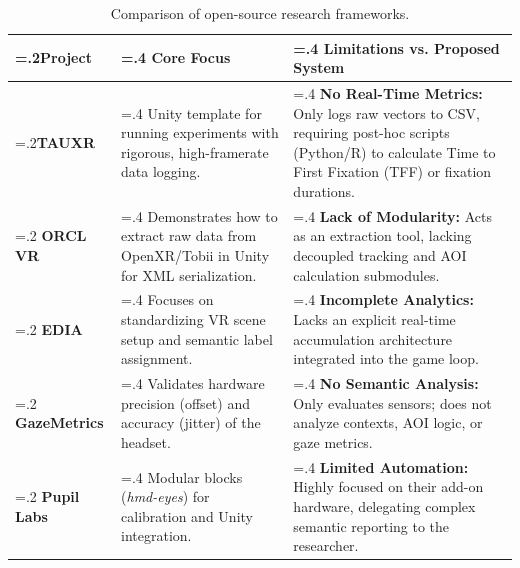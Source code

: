 \documentclass[12pt,a4paper]{article}
\begin{document}
\begin{table}[H]
    \centering
    \small
    \begin{tabularx}{\textwidth}{@{} >{\hsize=.2\hsize}X >{\hsize=.4\hsize}X >{\hsize=.4\hsize}X @{}}
        \toprule
        \textbf{Project}                        & \textbf{Core Focus}                                                                    & \textbf{Limitations vs. Proposed System}                                                                                                                            \\
        \midrule
        \textbf{TAUXR} \cite{tauxr}             & Unity template for running experiments with rigorous, high-framerate data logging.     & \textbf{No Real-Time Metrics:} Only logs raw vectors to CSV, requiring post-hoc scripts (Python/R) to calculate Time to First Fixation (TFF) or fixation durations. \\
        \addlinespace
        \textbf{ORCL VR} \cite{orcl}            & Demonstrates how to extract raw data from OpenXR/Tobii in Unity for XML serialization. & \textbf{Lack of Modularity:} Acts as an extraction tool, lacking decoupled tracking and AOI calculation submodules.                                                 \\
        \addlinespace
        \textbf{EDIA} \cite{edia}               & Focuses on standardizing VR scene setup and semantic label assignment.                 & \textbf{Incomplete Analytics:} Lacks an explicit real-time accumulation architecture integrated into the game loop.                                                 \\
        \addlinespace
        \textbf{GazeMetrics} \cite{gazemetrics} & Validates hardware precision (offset) and accuracy (jitter) of the headset.            & \textbf{No Semantic Analysis:} Only evaluates sensors; does not analyze contexts, AOI logic, or gaze metrics.                                                       \\
        \addlinespace
        \textbf{Pupil Labs} \cite{pupillabs}    & Modular blocks (\textit{hmd-eyes}) for calibration and Unity integration.              & \textbf{Limited Automation:} Highly focused on their add-on hardware, delegating complex semantic reporting to the researcher.                                      \\
        \bottomrule
    \end{tabularx}
    \caption{Comparison of open-source research frameworks.}
\end{table}
\end{document}
